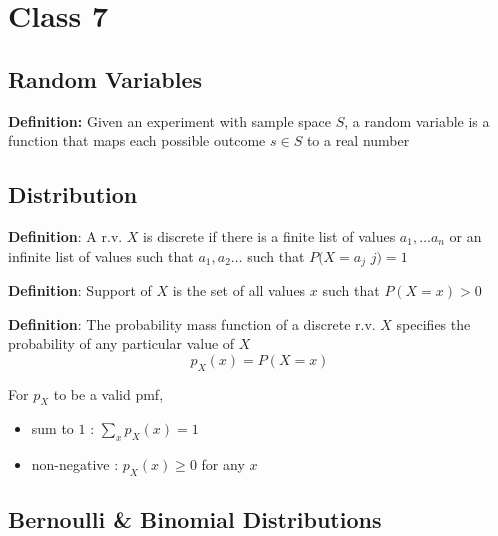 \chapter{Class 7}

\section{Random Variables}

\begin{framed}
   \textbf{Definition:} Given an experiment with sample space $S$, a random variable is a function that maps each possible outcome  $s \in S$ to a real number
\end{framed}

\section{Distribution}
\begin{framed}
   \textbf{Definition}: A r.v. $X$ is discrete if there is a finite list of values $a_1, \hdots a_n$ or an infinite list of values such that $a_1, a_2 \hdots$ such that $P(X = a_j$  $j) = 1$
\end{framed}

\begin{framed}
   \textbf{Definition}: Support of $X$ is the set of all values $x$ such that $P(X = x) > 0$
\end{framed}

\begin{framed}
   \textbf{Definition}: The probability mass function of a discrete r.v.  $X$ specifies the probability of any particular value of $X$ 
   \[
     p_X (x) = P(X = x)
   \] 

For $p_X$ to be a valid pmf, 
\begin{itemize}
   \item sum to $1$ : $\sum_x p_X(x) = 1$
   \item non-negative : $p_X(x) \geq 0$ for any $x$
\end{itemize}

\end{framed}

\section{Bernoulli \& Binomial Distributions}

